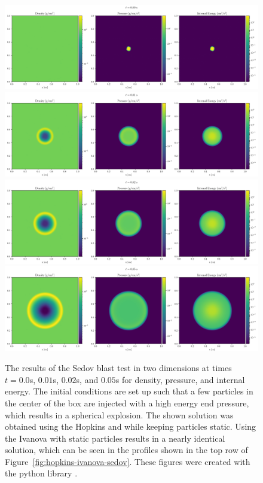 \begin{figure}
    \centering
    \includegraphics[width=\textwidth]{figures/Meshless/sedov_0000.png}%
\\
    \includegraphics[width=\textwidth]{figures/Meshless/sedov_0001.png}%
\\
    \includegraphics[width=\textwidth]{figures/Meshless/sedov_0002.png}%
\\
    \includegraphics[width=\textwidth]{figures/Meshless/sedov_0005.png}%
    \caption{
The results of the Sedov blast test in two dimensions at times $t = 0.0$s, $0.01$s, $0.02$s, and
$0.05$s for density, pressure, and internal energy. The initial conditions are set up such that a
few particles in the center of the box are injected with a high energy end pressure, which results
in a spherical explosion. The shown solution was obtained using the Hopkins \Aij and while keeping
particles static. Using the Ivanova \Aij with static particles results in a nearly identical
solution, which can be seen in the profiles shown in the top row of
Figure~\ref{fig:hopkins-ivanova-sedov}. These figures were created with the \swiftsimio python
library \citep{borrowSwiftsimioPythonLibrary2020}.
    }
    \label{fig:meshless-sedov-solution}
\end{figure}



